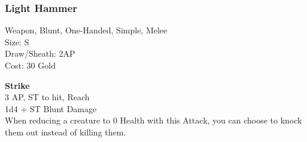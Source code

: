 \subsubsection{Light Hammer}\label{weapon:lightHammer}
Weapon, Blunt, One-Handed, Simple, Melee\\
Size: S\\
Draw/Sheath: 2AP\\
Cost: 30 Gold

\textbf{Strike} \\
3 AP, ST to hit,  Reach\\
1d4 + \texttimes ST Blunt Damage\\
When reducing a creature to 0 Health with this Attack, you can choose to knock them out instead of killing them.

